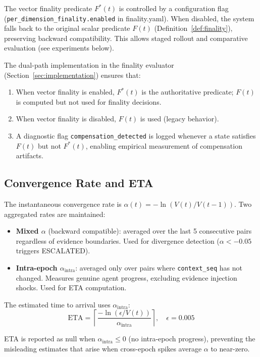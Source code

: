 \documentclass[11pt]{article}
\begin{document}
The vector finality predicate $F^*(t)$ is controlled by a configuration flag
(\texttt{per\_dimension\_finality.enabled} in finality.yaml). When disabled, the system falls back
to the original scalar predicate $F(t)$ (Definition~\ref{def:finality}), preserving backward
compatibility. This allows staged rollout and comparative evaluation (see experiments below).

The dual-path implementation in the finality evaluator (Section~\ref{sec:implementation}) ensures that:
\begin{enumerate}
  \item When vector finality is enabled, $F^*(t)$ is the authoritative predicate; $F(t)$ is computed
  but not used for finality decisions.
  \item When vector finality is disabled, $F(t)$ is used (legacy behavior).
  \item A diagnostic flag \texttt{compensation\_detected} is logged whenever a state satisfies $F(t)$
  but not $F^*(t)$, enabling empirical measurement of compensation artifacts.
\end{enumerate}

\subsection{Convergence Rate and ETA}

The instantaneous convergence rate is $\alpha(t) = -\ln(V(t) / V(t-1))$. Two aggregated rates are maintained:

\begin{itemize}
  \item \textbf{Mixed $\alpha$} (backward compatible): averaged over the last 5 consecutive pairs regardless of evidence boundaries. Used for divergence detection ($\alpha < -0.05$ triggers ESCALATED).
  \item \textbf{Intra-epoch $\alpha_{\text{intra}}$}: averaged only over pairs where \texttt{context\_seq} has not changed. Measures genuine agent progress, excluding evidence injection shocks. Used for ETA computation.
\end{itemize}

The estimated time to arrival uses $\alpha_{\text{intra}}$:
\[
\text{ETA} = \left\lceil \frac{-\ln(\epsilon / V(t))}{\alpha_{\text{intra}}} \right\rceil, \quad \epsilon = 0.005
\]

ETA is reported as null when $\alpha_{\text{intra}} \leq 0$ (no intra-epoch progress), preventing the misleading estimates that arise when cross-epoch spikes average $\alpha$ to near-zero.
\end{document}
